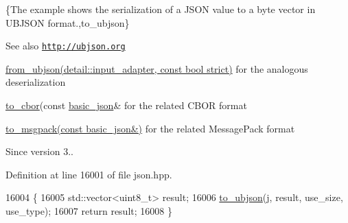 \{The example shows the serialization of a J\+S\+ON value to a byte vector in U\+B\+J\+S\+ON format.,to\+\_\+ubjson\}

\begin{DoxySeeAlso}{See also}
\href{http://ubjson.org}{\tt http\+://ubjson.\+org} 

\hyperlink{classnlohmann_1_1basic__json_afc590e292274a032cb0142d27778738e}{from\+\_\+ubjson(detail\+::input\+\_\+adapter, const bool strict)} for the analogous deserialization 

\hyperlink{classnlohmann_1_1basic__json_a2566783e190dec524bf3445b322873b8}{to\+\_\+cbor}(const \hyperlink{classnlohmann_1_1basic__json}{basic\+\_\+json}\& for the related C\+B\+OR format 

\hyperlink{classnlohmann_1_1basic__json_a09ca1dc273d226afe0ca83a9d7438d9c}{to\+\_\+msgpack(const basic\+\_\+json\&)} for the related Message\+Pack format
\end{DoxySeeAlso}
\begin{DoxySince}{Since}
version 3.. 
\end{DoxySince}


Definition at line 16001 of file json.\+hpp.


\begin{DoxyCode}
16004     \{
16005         std::vector<uint8\_t> result;
16006         \hyperlink{classnlohmann_1_1basic__json_ae1ece6c2059114eac10873f13ef19185}{to\_ubjson}(j, result, use\_size, use\_type);
16007         \textcolor{keywordflow}{return} result;
16008     \}
\end{DoxyCode}
\mbox{\label{classnlohmann_1_1basic__json_a480f6d5a30b9627b55831178266575a7}} 
